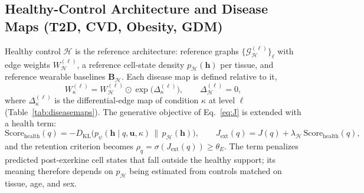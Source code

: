\documentclass[11pt]{article}
\begin{document}
\subsection{Healthy-Control Architecture and Disease Maps (T2D, CVD, Obesity, GDM)}
\label{sec:diseasemaps}
Healthy control $\mathcal{H}$ is the reference architecture: reference graphs $\{\mathcal{G}^{(\ell)}_{\mathcal{H}}\}_\ell$ with edge weights $W^{(\ell)}_{\mathcal{H}}$, a reference cell-state density $p_{\mathcal{H}}(\mathbf{h})$ per tissue, and reference wearable baselines $\mathbf{B}_{\mathcal{H}}$. Each disease map is defined relative to it,
\begin{equation}
W^{(\ell)}_{\kappa}=W^{(\ell)}_{\mathcal{H}}\odot\exp\!\big(\Delta^{(\ell)}_{\kappa}\big),\qquad \Delta^{(\ell)}_{\mathcal{H}}=0,
\end{equation}
where $\Delta^{(\ell)}_{\kappa}$ is the differential-edge map of condition $\kappa$ at level $\ell$ (Table~\ref{tab:diseasemaps}). The generative objective of Eq.~\eqref{eq:J} is extended with a health term:
\begin{equation}
\text{Score}_{\text{health}}(q)=-D_{\text{KL}}\!\big(p_\psi(\mathbf{h}\mid q,\mathbf{u},\kappa)\,\big\|\,p_{\mathcal{H}}(\mathbf{h})\big),\qquad
J_{\text{ext}}(q)=J(q)+\lambda_{\mathcal{H}}\,\text{Score}_{\text{health}}(q),
\end{equation}
and the retention criterion becomes $\rho_q=\sigma(J_{\text{ext}}(q))\ge\theta_E$. The term penalizes predicted post-exerkine cell states that fall outside the healthy support; its meaning therefore depends on $p_{\mathcal{H}}$ being estimated from controls matched on tissue, age, and sex.
\end{document}
